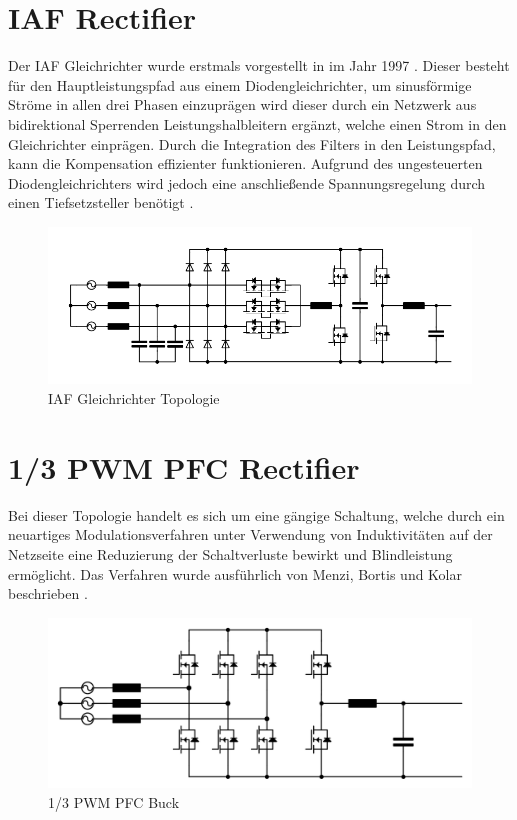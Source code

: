 \section{IAF Rectifier}
Der \gls{IAF} Gleichrichter wurde erstmals vorgestellt in \cite{IAFfirst} im Jahr 1997 . Dieser besteht für den Hauptleistungspfad aus einem Diodengleichrichter, um sinusförmige Ströme in allen drei Phasen einzuprägen wird dieser durch ein Netzwerk aus bidirektional Sperrenden Leistungshalbleitern ergänzt, welche einen Strom in den Gleichrichter einprägen. Durch die Integration des Filters in den Leistungspfad, kann die Kompensation effizienter funktionieren. Aufgrund des ungesteuerten Diodengleichrichters wird jedoch eine anschließende Spannungsregelung durch einen Tiefsetzsteller benötigt \cite{ThesisSchrittwieserBuckTypePFC2017}.

\begin{figure}
	\centering
	\includegraphics[width=0.7\linewidth]{content/Grafiken/IAF}
	\caption[\gls{IAF} Gleichrichter Topologie]{\gls{IAF} Gleichrichter Topologie}
	\label{fig:iaf}
\end{figure}


\section{1/3 PWM PFC Rectifier}
Bei dieser Topologie handelt es sich um eine gängige Schaltung, welche durch ein neuartiges Modulationsverfahren unter Verwendung von Induktivitäten auf der Netzseite eine Reduzierung der Schaltverluste bewirkt und Blindleistung ermöglicht. Das Verfahren wurde ausführlich von Menzi, Bortis und Kolar beschrieben \cite{13PWMPFC}.



\begin{figure}[H]
	\centering
	\includegraphics[width=0.7\linewidth]{content/Grafiken/B6_Buck}
	\caption[1/3 PWM PFC Buck]{1/3 PWM PFC Buck}
	\label{fig:b6buck}
\end{figure}


